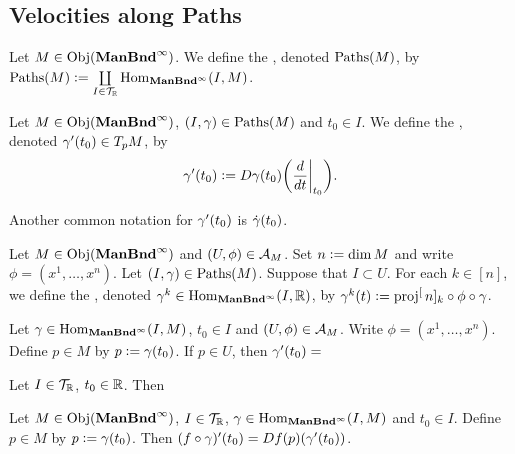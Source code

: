 \documentclass{book}
\begin{document}
	
	
	
	
	
	
	
	
	\subsection{Velocities along Paths}
	
	\begin{defn}
	\end{defn}
	
	\begin{defn}
		Let $M \in \operatorname{Obj}(\operatorname*{\text{\textbf{ManBnd}}^{\infty}})$. We define the , denoted $\text{Paths}(M)$, by $\text{Paths}(M) \vcentcolon= \coprod\limits_{I \in \mathcal{T}_{\mathbb{R}}} \operatorname{Hom}_{\operatorname*{\text{\textbf{ManBnd}}^{\infty}}}(I, M)$.
	\end{defn}
	
	\begin{defn} 
		Let $M \in \operatorname{Obj}(\operatorname*{\text{\textbf{ManBnd}}^{\infty}})$, $(I, \gamma) \in \text{Paths}(M)$ and $t_0 \in I$. We define the , denoted $\gamma'(t_0) \in T_pM$, by 
		$$\gamma'(t_0) \vcentcolon= D\gamma(t_0) \bigg(\frac{d}{dt}\bigg|_{t_0}\bigg).$$ 
	\end{defn}
	
	\begin{note}
		Another common notation for $\gamma'(t_0)$ is $\dot{\gamma}(t_0)$.
	\end{note}
	
	\begin{defn}
		Let $M \in \operatorname{Obj}(\operatorname*{\text{\textbf{ManBnd}}^{\infty}})$ and $(U, \phi) \in \mathcal{A}_M$. Set $n \vcentcolon= \dim M$ and write $\phi = (x^1, \ldots, x^n)$. Let $(I, \gamma) \in \text{Paths}(M)$. Suppose that $I \subset U$. For each $k \in [n]$, we define the , denoted $\gamma^k \in \operatorname{Hom}_{\operatorname*{\text{\textbf{ManBnd}}^{\infty}}}(I, \mathbb{R})$, by $\gamma^k(t) \vcentcolon= \operatorname{\text{proj}}^[n]_k \circ \phi \circ \gamma$.  
	\end{defn}
	
	Let $\gamma \in \operatorname{Hom}_{\operatorname*{\text{\textbf{ManBnd}}^{\infty}}}(I, M)$, $t_0 \in I$ and $(U, \phi) \in \mathcal{A}_M$. Write $\phi = (x^1, \ldots, x^n)$. Define $p \in M$ by $p \vcentcolon= \gamma(t_0)$. If $p \in U$, then $\gamma'(t_0) = $
	
	\begin{ex}
		Let $I \in \mathcal{T}_{\mathbb{R}}$, $t_0 \in \mathbb{R}$. Then 
	\end{ex}
	
	\begin{ex}
		Let $M \in \operatorname{Obj}(\operatorname*{\text{\textbf{ManBnd}}^{\infty}})$, $I \in \mathcal{T}_{\mathbb{R}}$, $\gamma \in \operatorname{Hom}_{\operatorname*{\text{\textbf{ManBnd}}^{\infty}}}(I, M)$ and $t_0 \in I$. Define $p \in M$ by $p \vcentcolon= \gamma(t_0)$. Then 
		$(f \circ \gamma)'(t_0) = Df(p) (\gamma'(t_0))$. 
	\end{ex}
	
\end{document}
